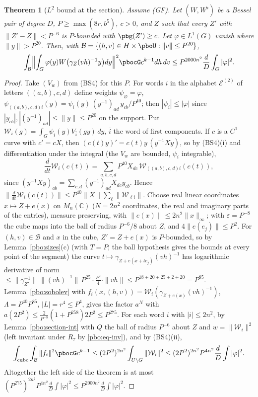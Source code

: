 \documentclass[10pt]{amsart}
\newtheorem{theorem}{Theorem}[section]
\theoremstyle{definition}
\theoremstyle{remark}
\newcommand{\C}{\mathbb C}
\begin{document}
\begin{theorem}[$L^2$ bound at the section]\label{pbo:schur-section}
Assume \textup{(GF)}. Let $(W,W^\flat)$ be a Bessel pair of degree $D$, $P\ge\max(8r,b^5)$, $c>0$, and
$Z$ such that every $Z'$ with $\|Z'-Z\|<P^{-6}$ is $P$-bounded with $\pbg(Z')\ge c$. Let $\varphi\in
L^1(G)$ vanish where $\|y\|>P^{20}$. Then, with $\mathcal B=\{(h,v)\in H\times\pboU:\|v\|\le P^{20}\}$,
\[
\int_{\mathcal B}\Bigl\|\int_G\varphi(y)W\bigl(\gamma_Z(vh)^{-1}y\bigr)dy\Bigr\|^2\pbocG c^{k-1}dh\,dv\le
P^{2000n^2}\frac dD\int_G|\varphi|^2 .
\]
\end{theorem}
\begin{proof}
Take $(V_w)$ from (BS4) for this $P$. For words $i$ in the alphabet $\mathcal E^{(2)}$ of letters
$((a,b),c,d)$ define weights $\psi_\varnothing=\varphi$, $\psi_{((a,b),c,d)i}(y)=\psi_i(y)\,(y^{-1})_{ad}\,y_{cb}/
P^{40}$; then $|\psi_i|\le|\varphi|$ since $|y_{cb}|,|(y^{-1})_{ad}|\le\|y\|\le P^{20}$ on the support. Put
$\mathcal W_i(g)=\int_G\psi_i(y)V_{\bar i}(gy)\,dy$, $\bar i$ the word of first components. If $c$ is a $C^1$
curve with $c'=cX$, then $(c(t)y)'=c(t)y\,(y^{-1}Xy)$, so by (BS4)(i) and differentiation under the
integral (the $V_w$ are bounded, $\psi_i$ integrable),
\[
\frac{d}{dt}\mathcal W_i(c(t))=\sum_{a,b,c,d}P^{40}X_{dc}\,\mathcal W_{((a,b),c,d)i}(c(t)),
\]
since $(y^{-1}Xy)_{ab}=\sum_{c,d}(y^{-1})_{ad}X_{dc}y_{cb}$. Hence $\|\frac d{dt}\mathcal W_i(c(t))\|\le P^{40}
\|X\|\sum_\ell\|\mathcal W_{\ell i}\|$. Choose real linear coordinates $x\mapsto Z+e(x)$ on $M_n(\C)$
($N=2n^2$ coordinates, the real and imaginary parts of the entries), measure preserving, with $\|e(x)\|
\le2n^2\|x\|_\infty$; with $\varepsilon=P^{-8}$ the cube maps into the ball of radius $P^{-6}/8$ about $Z$, and
$4\|e(e_j)\|\le P^2$. For $(h,v)\in\mathcal B$ and $x$ in the cube, $Z'=Z+e(x)$ is $P$-bounded, so by
Lemma~\ref{pbo:sizes}(c) (with $T=P$; the ball hypothesis gives the bounds at every point of the segment)
the curve $t\mapsto\gamma_{Z+e(x+te_j)}(vh)^{-1}$ has logarithmic derivative of norm $\le\|\gamma_{Z'}^{-1}\|\,
\|(vh)^{-1}\|\,P^{25}\cdot\frac{P^2}4\cdot\|vh\|\le P^{18+20+25+2+20}=P^{85}$. Lemma~\ref{pbo:sobolev} with
$f_i(x,(h,v))=\mathcal W_i(\gamma_{Z+e(x)}(vh)^{-1})$, $\Lambda=P^{40}P^{85}$, $|L|=r^4\le P^4$, gives the
factor $a^N$ with $a(2P^2)\le\frac2{P^{-8}}(1+P^{258})2P^2\le P^{275}$. For each word $i$ with $|i|\le2n^2$,
by Lemma~\ref{pbo:section-int} with $Q$ the ball of radius $P^{-6}$ about $Z$ and $w=\|\mathcal W_i\|^2$
(left invariant under $R_\tau$ by \eqref{pbo:eq-inv}), and by (BS4)(ii),
\[
\int_{\rm cube}\int_{\mathcal B}\|f_i\|^2\pbocG c^{k-1}\le(2P^2)^{2n^2}\int_{U\backslash G}\|\mathcal W_i\|^2\le
(2P^2)^{2n^2}P^{4n^2}\frac dD\int|\varphi|^2 .
\]
Altogether the left side of the theorem is at most $(P^{275})^{2n^2}P^{4n^2}\frac dD\int|\varphi|^2\le P^{2000n^2}
\frac dD\int|\varphi|^2$.
\end{proof}
\end{document}
